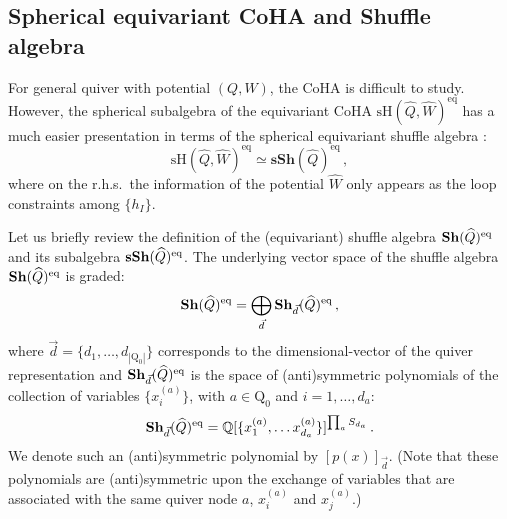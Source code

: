 \documentclass[12pt,a4paper]{article}
\renewcommand{\(}{\left(}
\renewcommand{\)}{\right)}
\renewcommand{\(}{\left(}
\renewcommand{\)}{\right)}
\begin{document}
\subsection{Spherical equivariant CoHA and Shuffle algebra}

For general quiver with potential $(Q,W)$, the CoHA is difficult to study.
However, the spherical subalgebra of the equivariant CoHA $\textrm{sH}(\widehat{Q},\widehat{W})^{\textrm{eq}}$  has a much easier presentation in terms of the spherical equivariant shuffle algebra \cite{Kontsevich:2010px}:
\begin{equation}
\textrm{sH}(\widehat{Q},\widehat{W})^{\textrm{eq}}\simeq \mathbf{sSh}(\widehat{Q})^{\textrm{eq}}\,,	
\end{equation}
where on the r.h.s.\ the information of the potential $\widehat{W}$ only appears as the loop constraints among $\{h_I\}$.



\medskip

Let us briefly review the definition of the (equivariant) shuffle algebra ${\bf Sh}(\widehat{Q})^{\textrm{eq}}$ and its subalgebra ${\bf sSh}(\widehat{Q})^{\textrm{eq}}$.
The underlying vector space of the shuffle algebra ${\bf Sh}(\widehat{Q})^{\textrm{eq}}$ is graded:
\begin{equation}
{\bf Sh}(\widehat{Q})^{\textrm{eq}}	=\bigoplus_{\vec{d}} {\bf Sh}_{\vec{d}}(\widehat{Q})^{\textrm{eq}}\,,
\end{equation}
where $\vec{d}=\{d_1,\dots,d_{|\mathrm{Q}_0|}\}$ corresponds to the dimensional-vector of the quiver representation and  ${\bf Sh}_{\vec{d}}(\widehat{Q})^{\textrm{eq}}$ is the space of  (anti)symmetric polynomials of the collection of variables $\{x^{(a)}_{i}\}$, with $a\in \mathrm{Q}_0$ and $i=1,\ldots, d_a$:
\begin{equation}
{\bf Sh}_{\vec{d}}(\widehat{Q})^{\textrm{eq}} =\mathbb{Q}[\{x^{(a)}_{1},\dots x^{(a)}_{d_a}\}]^{\prod_a S_{d_a}}\,.
\end{equation}
We denote such an (anti)symmetric polynomial by $[p(x)]_{\vec{d}}$.
(Note that these polynomials are (anti)symmetric upon the exchange of variables that are associated with
the same quiver node $a$, $x^{(a)}_i$ and $x^{(a)}_j$.)
\end{document}
